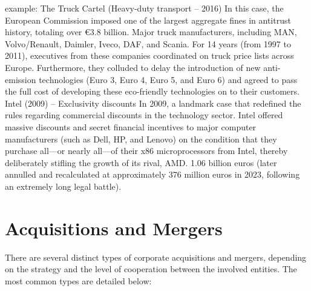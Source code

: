 \documentclass[12pt,a4paper]{report}
\begin{document}
example:
 The Truck Cartel (Heavy-duty transport – 2016)
In this case, the European Commission imposed one of the largest aggregate fines in antitrust history, totaling over €3.8 billion.
 Major truck manufacturers, including MAN, Volvo/Renault, Daimler, Iveco, DAF, and Scania.
For 14 years (from 1997 to 2011), executives from these companies coordinated on truck price lists across Europe. Furthermore, they colluded to delay the introduction of new anti-emission technologies (Euro 3, Euro 4, Euro 5, and Euro 6) and agreed to pass the full cost of developing these eco-friendly technologies on to their customers.
\\
Intel (2009) – Exclusivity discounts
In 2009, a landmark case that redefined the rules regarding commercial discounts in the technology sector.
Intel offered massive discounts and secret financial incentives to major computer manufacturers (such as Dell, HP, and Lenovo) on the condition that they purchase all—or nearly all—of their x86 microprocessors from Intel, thereby deliberately stifling the growth of its rival, AMD.
1.06 billion euros (later annulled and recalculated at approximately 376 million euros in 2023, following an extremely long legal battle).

\chapter{Acquisitions and Mergers}

There are several distinct types of corporate acquisitions and mergers, depending on the strategy and the level of cooperation between the involved entities. The most common types are detailed below:
\end{document}
